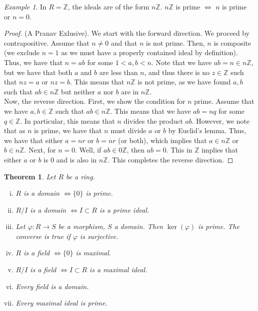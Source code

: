 \documentclass{amsart}
\newcommand{\ZZ}{\mathbb{Z}}
\newtheorem{thm}{Theorem}[section]
\theoremstyle{definition}
\theoremstyle{remark}
\newtheorem*{ex}{Example}
\begin{document}
\begin{ex}
    In $R = \ZZ$, the ideals are of the form $n\ZZ$. $n\ZZ$ is prime $\iff$ $n$ is prime or $n = 0$.
\end{ex}
\begin{proof}
    (A Pranav Exlusive). We start with the forward direction. We proceed by contrapositive.
    Assume that $n \neq 0$ and that $n$ is not prime. Then, $n$ is composite (we exclude $n = 1$ as
    we must have a properly contained ideal by definition). Thus, we have that $n = ab$ for some $1 < a,b < n$.
    Note that we have $ab = n \in n\ZZ$, but we have that both $a$ and $b$ are less than $n$, and thus there is no $z \in \ZZ$
    such that $nz = a$ or $nz = b$. This means that $n\ZZ$ is not prime, as we have found $a,b$ such that
    $ab \in n\ZZ$ but neither $a$ nor $b$ are in $n\ZZ$. \\
    Now, the reverse direction. First, we show the condition for $n$ prime. Assume that we have $a,b \in \ZZ$ such that $ab \in n\ZZ$.
    This means that we have $ab = nq$ for some $q \in \ZZ$. In particular, this means that $n$ divides
    the product $ab$. However, we note that as $n$ is prime, we have that $n$ must divide $a$
    or $b$ by Euclid's lemma. Thus, we have that either $a = nr$ or $b = nr$ (or both), which implies
    that $a \in n\ZZ$ or $b \in n\ZZ$. Next, for $n = 0$. Well, if $ab \in 0\ZZ$, then $ab = 0$. This in $\ZZ$ implies
    that either $a$ or $b$  is $0$ and is also in $n\ZZ$. This completes the reverse direction.
\end{proof}
\begin{thm}\label{thm:ideals}
    Let $R$ be a ring.
    \begin{enumerate}[i)]
        \item $R$ is a domain $\iff \{0\}$ is prime.
        \item $R / I$ is a domain $\iff I \subset R$ is a prime ideal.
        \item Let $\varphi: R \rightarrow S$ be a morphism, $S$ a domain. Then
        $\ker(\varphi)$ is prime. The converse is true if $\varphi$ is surjective.
        \item $R$ is a field $\iff \{0\}$ is maximal.
        \item $R / I$ is a field $\iff I \subset R$ is a maximal ideal.
        \item Every field is a domain.
        \item Every maximal ideal is prime.
    \end{enumerate}
\end{thm}
\end{document}
